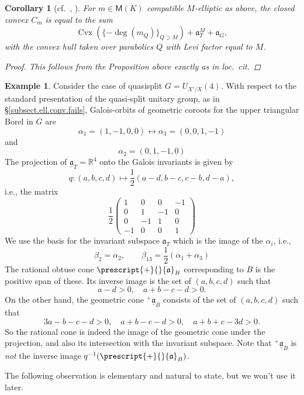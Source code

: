 \documentclass[openany]{amsbook}
\newtheorem{corollary}[theorem]{Corollary}
\theoremstyle{definition}
\newtheorem{example}[theorem]{Example}
\theoremstyle{remark}
\numberwithin{equation}{section}
\newcommand{\ul}[1]{\underline{#1}}
\renewcommand{\-}{\operatorname{-}}
\newcommand{\Cvx}{\operatorname{Cvx}}
\renewcommand{\a}{\mathfrak{a}}
\newcommand{\bM}{\mathsf{M}}
\newcommand{\obtcone}{\prescript{+}{}{\a}}
\newcommand{\ga}{\ul{\a}}
\newcommand{\gobtcone}{{}^+ \ul{\a}}
\begin{document}
\begin{corollary}[{{cf.\ \cite[Proposition 5.8.1]{CLI}, \cite[Lemma 5.2.5]{behrendthesis}}}]\label{cor.cvx.hull} 
For $m \in \bM(K)$ compatible $M$-elliptic as above, the closed convex
    $C_m$ is equal to the sum
    $$
        \Cvx\left(\{-\deg(m_Q)\}_{Q \supset M}\right) + \a_T^M + \a_G,
    $$
    with the convex hull taken over parabolics $Q$ with Levi factor equal to $M$.
    \begin{proof}
        This follows from the Proposition above exactly as in \textit{loc.\ cit.}
    \end{proof}
\end{corollary}

\begin{example}
    Consider the case of quasisplit $G = U_{X'/X}(4)$. With respect to the standard presentation of the quasi-split unitary group, as in \S \ref{subsect.ell.conv.fails}, Galois-orbits of geometric coroots for the upper triangular Borel in $G$ are 
$$
\alpha_{1} = (1, -1, 0, 0) \longleftrightarrow \alpha_{3} = (0,0, 1, -1)
$$
and
$$
\alpha_{2} = (0, 1, -1, 0)
$$
The projection of $\ga_T = \mathbb{R}^4$ onto the Galois invariants is given by 
$$
q : (a,b,c,d) \mapsto \frac{1}{2}(a-d, b-c, c-b, d-a),
$$
i.e., the matrix
$$
\frac{1}{2}\begin{pmatrix}
1 & 0 & 0 & -1\\
0 & 1 & -1 & 0\\
0 & -1 & 1 & 0\\
-1 & 0 & 0 & 1
\end{pmatrix}
$$
We use the basis for the invariant subspace $\a_T$ which is the image of the $\alpha_i$, i.e.,
$$
\beta_{2} = \alpha_{2}, \qquad \beta_{13} = \frac{1}{2} (\alpha_{1} + \alpha_{3})
$$
The rational obtuse cone $\obtcone_B$ corresponding to $B$ is the positive span of these. Its inverse image is the set of $(a,b,c,d)$ such that 
$$
   a - d > 0, \quad a+b - c - d > 0.
$$
On the other hand, the geometric cone $\gobtcone_B$ consists of the set of $(a,b,c,d)$ such that 
$$
    3a - b - c -d > 0, \quad a + b - c - d > 0, \quad a + b + c - 3d > 0.
$$
So the rational cone is indeed the image of the geometric cone under the projection, and also its intersection with the invariant subspace. Note that $\gobtcone_B$ is \textit{not} the inverse image $q^{-1}(\obtcone_B)$.
\end{example}

The following observation is elementary and natural to state, but we won't use it later.
\end{document}
